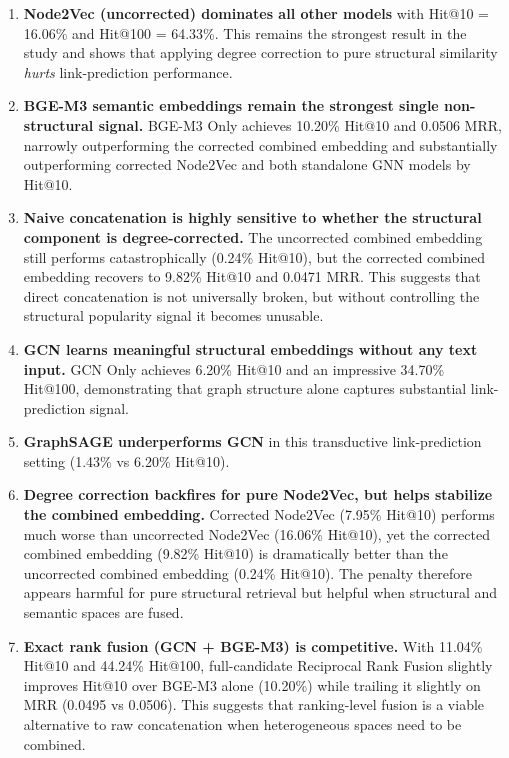 \documentclass[12pt,a4paper]{article}
\begin{document}
\begin{enumerate}
    \item \textbf{Node2Vec (uncorrected) dominates all other models} with Hit@10 = 16.06\% and Hit@100 = 64.33\%.  This remains the strongest result in the study and shows that applying degree correction to pure structural similarity \emph{hurts} link-prediction performance.

    \item \textbf{BGE-M3 semantic embeddings remain the strongest single non-structural signal.} BGE-M3 Only achieves 10.20\% Hit@10 and 0.0506 MRR, narrowly outperforming the corrected combined embedding and substantially outperforming corrected Node2Vec and both standalone GNN models by Hit@10.

    \item \textbf{Naive concatenation is highly sensitive to whether the structural component is degree-corrected.} The uncorrected combined embedding still performs catastrophically (0.24\% Hit@10), but the corrected combined embedding recovers to 9.82\% Hit@10 and 0.0471 MRR.  This suggests that direct concatenation is not universally broken, but without controlling the structural popularity signal it becomes unusable.

    \item \textbf{GCN learns meaningful structural embeddings without any text input.} GCN Only achieves 6.20\% Hit@10 and an impressive 34.70\% Hit@100, demonstrating that graph structure alone captures substantial link-prediction signal.

    \item \textbf{GraphSAGE underperforms GCN} in this transductive link-prediction setting (1.43\% vs 6.20\% Hit@10).

    \item \textbf{Degree correction backfires for pure Node2Vec, but helps stabilize the combined embedding.} Corrected Node2Vec (7.95\% Hit@10) performs much worse than uncorrected Node2Vec (16.06\% Hit@10), yet the corrected combined embedding (9.82\% Hit@10) is dramatically better than the uncorrected combined embedding (0.24\% Hit@10).  The penalty therefore appears harmful for pure structural retrieval but helpful when structural and semantic spaces are fused.

    \item \textbf{Exact rank fusion (GCN + BGE-M3) is competitive.} With 11.04\% Hit@10 and 44.24\% Hit@100, full-candidate Reciprocal Rank Fusion slightly improves Hit@10 over BGE-M3 alone (10.20\%) while trailing it slightly on MRR (0.0495 vs 0.0506).  This suggests that ranking-level fusion is a viable alternative to raw concatenation when heterogeneous spaces need to be combined.
\end{enumerate}
\end{document}
